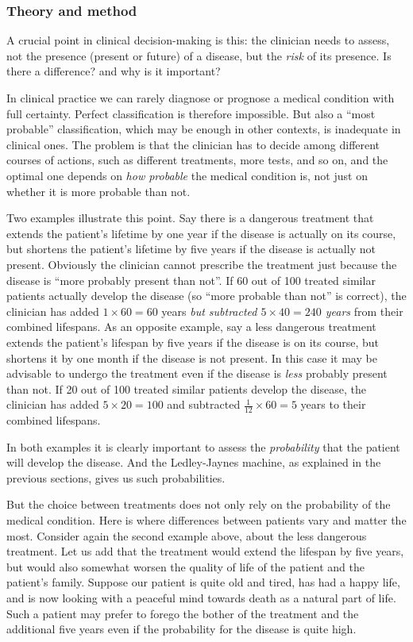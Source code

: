 \documentclass[utf8]{FrontiersinHarvard} %
\renewcommand*{\|}[1][]{\nonscript\:#1\vert\nonscript\:\mathopen{}}
\newcommand*{\ljm}{Ledley-Jaynes machine}
\begin{document}
\subsubsection{Theory and method}
\label{sec:expected_utility_theory}


A crucial point in clinical decision-making is this: the clinician needs to assess, not the presence (present or future) of a disease, but the \emph{risk} of its presence. Is there a difference? and why is it important?

In clinical practice we can rarely diagnose or prognose a medical condition with full certainty. Perfect classification is therefore impossible. But also a \enquote{most probable} classification, which may be enough in other contexts, is inadequate in clinical ones. The problem is that the clinician has to decide among different courses of actions, such as different treatments, more tests, and so on, and the optimal one depends on \emph{how probable} the medical condition is, not just on whether it is more probable than not.

Two examples illustrate this point. Say there is a dangerous treatment that extends the patient's lifetime by one year if the disease is actually on its course, but shortens the patient's lifetime by five years if the disease is actually not present. Obviously the clinician cannot prescribe the treatment just because the disease is \enquote{more probably present than not}. If 60 out of 100 treated similar patients actually develop the disease (so \enquote{more probable than not} is correct), the clinician has added $1 \times 60 = 60$ years \emph{but subtracted $\mathit{5 \times 40 = 240}$ years} from their combined lifespans. As an opposite example, say a less dangerous treatment extends the patient's lifespan by five years if the disease is on its course, but shortens it by one month if the disease is not present. In this case it may be advisable to undergo the treatment even if the disease is \emph{less} probably present than not. If 20 out of 100 treated similar patients develop the disease, the clinician has added $5 \times 20=100$ and subtracted $\tfrac{1}{12} \times 60=5$ years to their combined lifespans.

In both examples it is clearly important to assess the \emph{probability} that the patient will develop the disease. And the \ljm, as explained in the previous sections, gives us such probabilities.

But the choice between treatments does not only rely on the probability of the medical condition. Here is where differences between patients vary and matter the most. Consider again the second example above, about the less dangerous treatment. Let us add that the treatment would extend the lifespan by five years, but would also somewhat worsen the quality of life of the patient and the patient's family. Suppose our patient is quite old and tired, has had a happy life, and is now looking with a peaceful mind towards death as a natural part of life. Such a patient may prefer to forego the bother of the treatment and the additional five years even if the probability for the disease is quite high.
\end{document}
